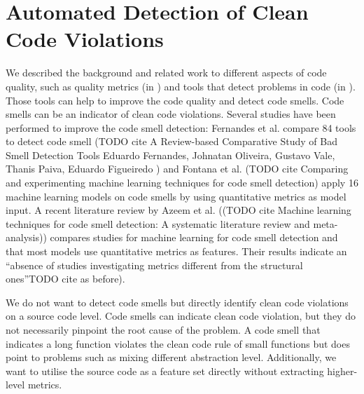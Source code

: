 \section{Automated Detection of Clean Code Violations}
We described the background and related work to different aspects of code quality, such as quality metrics (in ) and tools that detect problems in code (in ). Those tools can help to improve the code quality and detect code smells. Code smells can be an indicator of clean code violations. Several studies have been performed to improve the code smell detection: Fernandes et al. compare 84 tools to detect code smell (TODO cite A Review-based Comparative Study of Bad Smell Detection Tools Eduardo Fernandes, Johnatan Oliveira, Gustavo Vale, Thanis Paiva, Eduardo Figueiredo ) and Fontana et al. (TODO cite Comparing and experimenting machine learning techniques for code smell detection) apply 16 machine learning models on code smells by using quantitative metrics as model input. A recent literature review by Azeem et al. ((TODO cite Machine learning techniques for code smell detection: A systematic literature review and meta-analysis)) compares studies for machine learning for code smell detection and that most models use quantitative metrics as features. Their results indicate an \enquote{absence of studies investigating metrics different from the structural
ones}TODO cite as before).

We do not want to detect code smells but directly identify clean code violations on a source code level. Code smells can indicate clean code violation, but they do not necessarily pinpoint the root cause of the problem. A code smell that indicates a long function violates the clean code rule of small functions but does point to problems such as mixing different abstraction level. Additionally, we want to utilise the source code as a feature set directly without extracting higher-level metrics.